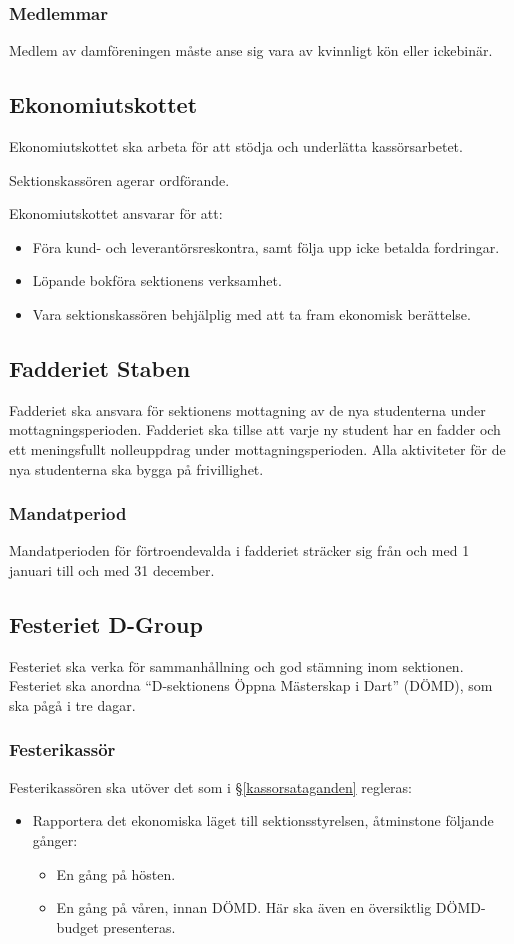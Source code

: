 \documentclass{datateknologsektionen-document}
\begin{document}
\subsubsection{Medlemmar}
Medlem av damföreningen måste anse sig vara av kvinnligt kön eller ickebinär.

\subsection{Ekonomiutskottet}
Ekonomiutskottet ska arbeta för att stödja och underlätta kassörsarbetet.

Sektionskassören agerar ordförande.

Ekonomiutskottet ansvarar för att:

\begin{itemize}
    \item Föra kund- och leverantörsreskontra, samt följa upp icke betalda fordringar.
    \item Löpande bokföra sektionens verksamhet.
    \item Vara sektionskassören behjälplig med att ta fram ekonomisk berättelse.
\end{itemize}

\subsection{Fadderiet Staben}
Fadderiet ska ansvara för sektionens mottagning av de nya studenterna under mottagningsperioden.
Fadderiet ska tillse att varje ny student har en fadder och ett meningsfullt nolleuppdrag
under mottagningsperioden. Alla aktiviteter för de nya studenterna ska bygga på frivillighet.

\subsubsection{Mandatperiod}
Mandatperioden för förtroendevalda i fadderiet sträcker sig från och med 1 januari till och med 31 december.

\subsection{Festeriet D-Group}
Festeriet ska verka för sammanhållning och god stämning inom sektionen. Festeriet ska
anordna ``D-sektionens Öppna Mästerskap i Dart'' (DÖMD), som ska pågå i tre dagar.

\subsubsection{Festerikassör}
Festerikassören ska utöver det som i \S \ref{kassorsataganden} regleras:
\begin{itemize}
  \item Rapportera det ekonomiska läget till sektionsstyrelsen, åtminstone följande gånger:
        \begin{itemize}
          \item En gång på hösten.
          \item En gång på våren, innan DÖMD. Här ska även en översiktlig DÖMD-budget presenteras.
        \end{itemize}
\end{itemize}
\end{document}
